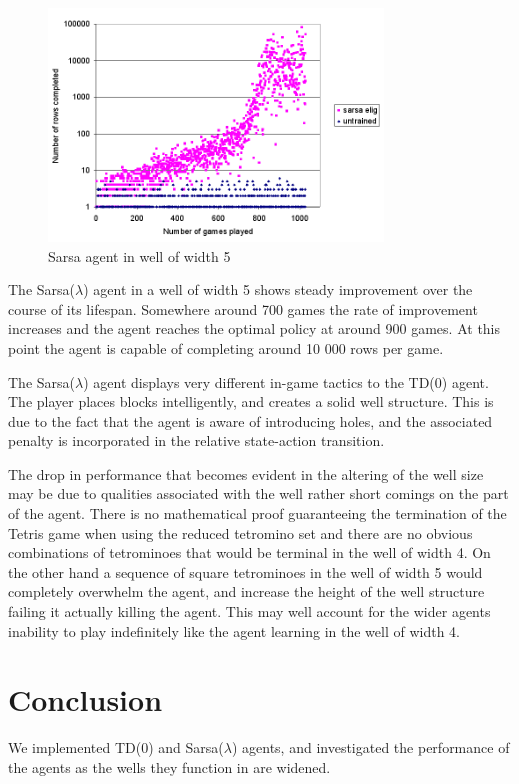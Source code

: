 \documentclass{rucsthesis}
\begin{document}
\begin{figure}[h]
\centering
\includegraphics[width=3.5in]{sarsaeligredtet5well.png}
\caption{Sarsa agent in well of width 5}
\label{fig:sarsaeligredtet5well}
\end{figure}

The Sarsa($\lambda$) agent in a well of width 5 shows steady improvement over the course of its lifespan. Somewhere around 700 games the rate of improvement increases and the agent reaches the optimal policy at around 900 games. At this point the agent is capable of completing around 10 000 rows per game.

The Sarsa($\lambda$) agent displays very different in-game tactics to the TD(0) agent. The player places blocks intelligently, and creates a solid well structure. This is due to the fact that the agent is aware of introducing holes, and the associated penalty is incorporated in the relative state-action transition.

The drop in performance that becomes evident in the altering of the well size may be due to qualities associated with the well rather short comings on the part of the agent. There is no mathematical proof guaranteeing the termination of the Tetris game when using the reduced tetromino set and there are no obvious combinations of tetrominoes that would be terminal in the well of width 4. On the other hand a sequence of square tetrominoes in the well of width 5 would completely overwhelm the agent, and increase the height of the well structure failing it actually killing the agent. This may well account for the wider agents inability to play indefinitely like the agent learning in the well of width 4.

\section{Conclusion}

We implemented TD(0) and Sarsa($\lambda$) agents, and investigated the performance of the agents as the wells they function in are widened. 
\end{document}
